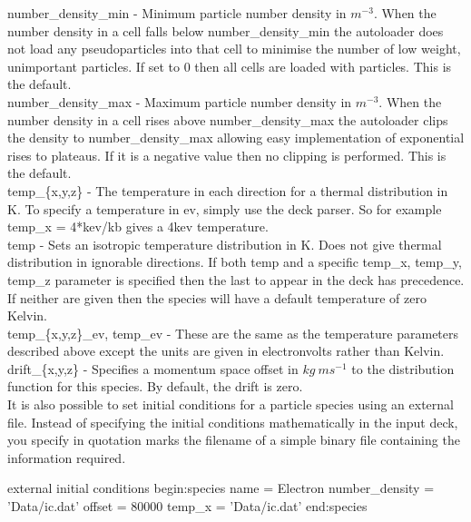 {\emphtext number\_density\_min} - Minimum particle number density in $m^{-3}$.
When the number density in a cell falls below number\_density\_min the
autoloader does not load any pseudoparticles into that cell to minimise the
number of low weight, unimportant particles. If set to 0 then all cells are
loaded with particles. This is the default.\\

{\emphtext number\_density\_max} - Maximum particle number density in $m^{-3}$.
When the number density in a cell rises above number\_density\_max the
autoloader clips the density to number\_density\_max allowing easy
implementation of exponential rises to plateaus. If it is a negative value
then no clipping is performed. This is the default.\\

{\emphtext temp\_\{x,y,z\}} - The temperature in each direction for a thermal
distribution in K. To specify a temperature in ev, simply use the deck
parser. So for example temp\_x = 4*kev/kb gives a 4kev temperature.\\

{\emphtext temp} - Sets an isotropic temperature distribution in K. Does not
give thermal distribution in ignorable directions. If both temp and a specific
temp\_x, temp\_y, temp\_z parameter is specified then the last to appear in the
deck has precedence. If neither are given then the species will have a default
temperature of zero Kelvin.\\

{\emphtext temp\_\{x,y,z\}\_ev, temp\_ev} - These are the same as the
temperature parameters described above except the units are given in
electronvolts rather than Kelvin.\\

{\emphtext drift\_\{x,y,z\}} - Specifies a momentum space offset in
$kg\ ms^{-1}$ to the distribution function for this species. By default,
the drift is zero.\\

It is also possible to set initial conditions for a particle species
using an external file.  Instead of specifying the
initial conditions mathematically in the input deck, you specify in quotation
marks the filename of a simple binary file containing the information required.

\begin{lboxverbatim}{external initial conditions}
begin:species
   name = Electron
   number_density = 'Data/ic.dat'
   offset = 80000
   temp_x = 'Data/ic.dat'
end:species
\end{lboxverbatim}


